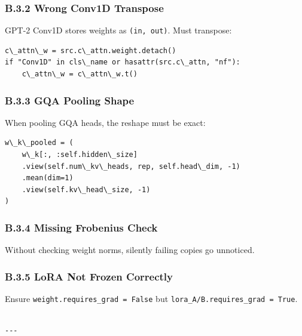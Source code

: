 \subsubsection{B.3.2 Wrong Conv1D Transpose}

GPT-2 Conv1D stores weights as \texttt{(in, out)}. Must transpose:

\begin{lstlisting}
c\_attn\_w = src.c\_attn.weight.detach()
if "Conv1D" in cls\_name or hasattr(src.c\_attn, "nf"):
    c\_attn\_w = c\_attn\_w.t()
\end{lstlisting}

\subsubsection{B.3.3 GQA Pooling Shape}

When pooling GQA heads, the reshape must be exact:

\begin{lstlisting}
w\_k\_pooled = (
    w\_k[:, :self.hidden\_size]
    .view(self.num\_kv\_heads, rep, self.head\_dim, -1)
    .mean(dim=1)
    .view(self.kv\_head\_size, -1)
)
\end{lstlisting}

\subsubsection{B.3.4 Missing Frobenius Check}

Without checking weight norms, silently failing copies go unnoticed.

\subsubsection{B.3.5 LoRA Not Frozen Correctly}

Ensure \texttt{weight.requires\_grad = False} but \texttt{lora\_A/B.requires\_grad = True}.
\begin{lstlisting}

---
\end{lstlisting}